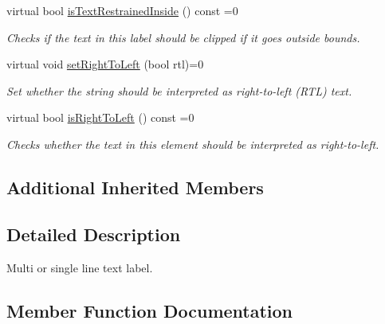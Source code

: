 \begin{DoxyCompactItemize}
\mbox{\label{classirr_1_1gui_1_1IGUIStaticText_a90823f5df79cfd4e2e3a20f38bc3b65a}} 
virtual bool \hyperlink{classirr_1_1gui_1_1IGUIStaticText_a90823f5df79cfd4e2e3a20f38bc3b65a}{is\+Text\+Restrained\+Inside} () const =0
\begin{DoxyCompactList}\small\item\em Checks if the text in this label should be clipped if it goes outside bounds. \end{DoxyCompactList}\item 
virtual void \hyperlink{classirr_1_1gui_1_1IGUIStaticText_a43cee247cf34faa30851f4e8c10b2367}{set\+Right\+To\+Left} (bool rtl)=0
\begin{DoxyCompactList}\small\item\em Set whether the string should be interpreted as right-\/to-\/left (R\+TL) text. \end{DoxyCompactList}\item 
\mbox{\label{classirr_1_1gui_1_1IGUIStaticText_a750a43d48f16d0e89aa28a0175a06ff6}} 
virtual bool \hyperlink{classirr_1_1gui_1_1IGUIStaticText_a750a43d48f16d0e89aa28a0175a06ff6}{is\+Right\+To\+Left} () const =0
\begin{DoxyCompactList}\small\item\em Checks whether the text in this element should be interpreted as right-\/to-\/left. \end{DoxyCompactList}\end{DoxyCompactItemize}
\subsection*{Additional Inherited Members}


\subsection{Detailed Description}
Multi or single line text label. 

\subsection{Member Function Documentation}
\mbox{\label{classirr_1_1gui_1_1IGUIStaticText_ae1f432263d4c638b0441f8b993f301bc}} 
